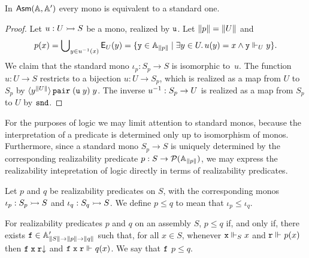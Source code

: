 \begin{proposition}
  In $\AsmA$ every mono is equivalent to a standard one.
\end{proposition}

\begin{proof}
  Let $u : U \monoto S$ be a mono, realized by $\R{u}$.
  Let $\T{p} = \T{U}$ and
  \begin{equation*}
    p(x) = \tbigcup_{y \in \inv{u}(x)} \Ex_U(y) =
    \set{\R{y} \in \Atyp{\T{p}} \such \some{y \in U}{u(y) = x \land \R{y} \rz[U] y}}.
  \end{equation*}
  We claim that the standard mono $\iota_p : S_p \to S$ is
  isomorphic to~$u$. The function $u : U \to S$ restricts to a
  bijection $u : U \to S_p$, which is realized as a map from $U$
  to $S_p$ by
  $\tpcalam{y}{\T{U}} \combPair\;(\R{u}\;y)\;y$. The inverse
  $\inv{u} : S_p \to U$ is realized as a map from $S_p$ to
  $U$ by $\combSnd$.
\end{proof}

For the purposes of logic we may limit attention to standard monos,
because the interpretation of a predicate is determined only up to
isomorphism of monos. Furthermore, since a standard mono $S_p
\to S$ is uniquely determined by the corresponding realizability
predicate $p : S \to \pow{\Atyp{\T{p}}}$, we may express the
realizability intepretation of logic directly in terms of
realizability predicates.

Let $p$ and $q$ be realizability predicates on $S$, with the
corresponding monos $\iota_p : S_p \monoto S$ and $\iota_q
: S_q \monoto S$. We define $p \leq q$ to mean that
$\iota_p \leq \iota_q$.

\begin{lemma}
  \label{lemma:realizability-predicate-leq}%
  For realizability predicates $p$ and $q$ on an assembly $S$,
  $p \leq q$ if, and only if, there exists $\R{f} \in \subAtyp{\T{S}
    \to \T{p} \to \T{q}}$ such that, for all $x \in S$, whenever $\R{x}
  \rz[S] x$ and $\R{r} \rz p(x)$ then $\defined{\R{f}\;\R{x}\;\R{r}}$
  and $\R{f}\;\R{x}\;\R{r} \rz q(x)$. We say that $\R{f}$
   $p \leq q$.
\end{lemma}

